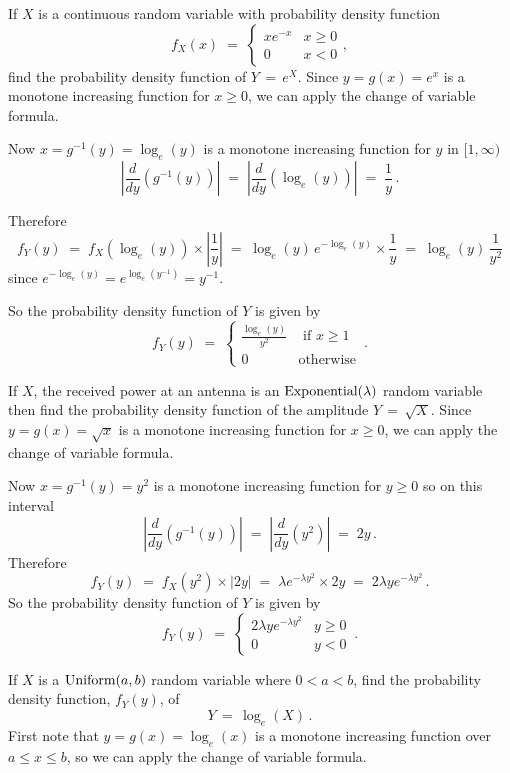 \begin{ExerciseList}
\Exercise
If $X$ is a continuous random variable with probability density function
\[
f_X(x)\;=\;\begin{cases} x e^{- x} &  x\geqslant 0\\ 0 & x< 0\end{cases},
\]
find the probability density function of $Y\,=\, e^X$.
\Answer
Since  $y=g(x) = e^x$ is a monotone increasing function for $x \geqslant 0$,  we can apply the change of variable formula.

Now $x= g^{-1}(y) = \log_e(y)$ is a monotone increasing function for $y$ in $[1,\infty)$
\[\left|  \frac{d}{dy}\left(g^{-1}(y)\right)\right|\;=\; \left|  \frac{d}{dy}\left(\log_e(y)\right)\right|\;=\; \frac{1}{y}\,.\]

Therefore
\[
  f_Y(y) \;=\; f_X\left( \log_e(y)\right) \times  \left| \frac{1}{y} \right|\;=\;  \log_e(y) \,e^{-\log_e(y)} \times  \frac{1}{y} \;=\; \log_e(y) \, \frac{1}{y^2}
\]
since $e^{-\log_e(y)} = e^{\log_e(y^{-1})}  = y^{-1}$.

So the  probability density
  function  of $Y$ is given by
\[f_Y(y)\;=\;\begin{cases} \displaystyle  \frac{\log_e(y)}{y^2} &   \text{ if } x \geqslant 1 \\ 0 &
  \text{otherwise}
\end{cases} \,.
\]

\Exercise
If $X$, the received power at an antenna is an $\mbox{{\rm Exponential}}(\lambda)$ random variable then find the probability density function of the amplitude $Y\,=\, \sqrt X$.
\Answer
Since $y=g(x) = \sqrt{x}$ is a monotone increasing function for $x \geqslant 0$,  we can apply the change of variable formula.

Now $x= g^{-1}(y) = y^2$ is a monotone increasing function for $y\geqslant 0$ so on this interval
\[
\left|  \frac{d}{dy}\left(g^{-1}(y)\right)\right|\;=\; \left|  \frac{d}{dy}\left( y^2\right)\right|\;=\; 2y\,.\]
Therefore
\[
f_Y(y) 
\;=\; f_X\left(  y^2\right) \times  \left| 2y \right|
\;=\;  \lambda e ^{-\lambda y^2} \times  2y  \;=\;   2 \lambda y e ^{-\lambda y^2}\,.
\]
So the  probability density function  of $Y$ is given by
\[
f_Y(y)\;=\;\begin{cases} \displaystyle  2 \lambda y e ^{-\lambda y^2}   &    y\geqslant 0 \\ 0 & y <0
\end{cases} \,.
\]


\Exercise
If $X$ is a $\mbox{{\rm Uniform}}(a,b)$ random variable where $0 < a < b$, find  the probability density function, $f_Y (y)$, of \[ Y\,=\, \log_e(X) \, .\]
\Answer
First note that $y=g(x) = \log_e(x)$ is a monotone increasing function over  $a \leqslant x \leqslant b$, so we can apply the change of variable formula.


\end{ExerciseList}
